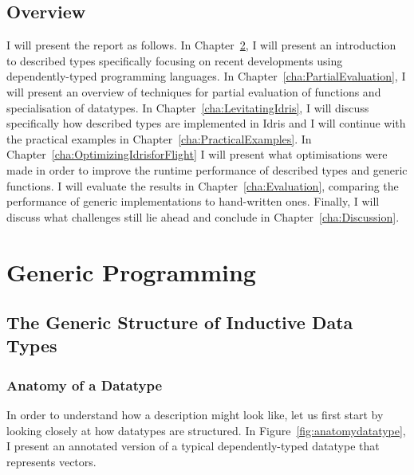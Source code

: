 \documentclass{ituthesis}
\begin{document}
\section{Overview}
\label{sec:Overview}
I will present the report as follows. In Chapter~\ref{cha:GenericProgramming}, I will present an introduction to described types specifically focusing on recent developments using dependently-typed programming languages.
In Chapter~\ref{cha:PartialEvaluation}, I will present an overview of techniques for partial evaluation of functions and specialisation of datatypes. In Chapter~\ref{cha:LevitatingIdris}, I will discuss specifically how described types are implemented in Idris and I will continue with the practical examples in Chapter~\ref{cha:PracticalExamples}.
In Chapter~\ref{cha:OptimizingIdrisforFlight} I will present what optimisations were made in order to improve the runtime performance of described types and generic functions. I will evaluate the results in Chapter~\ref{cha:Evaluation}, comparing the performance of generic implementations to hand-written ones.
Finally, I will discuss what challenges still lie ahead and conclude in Chapter~\ref{cha:Discussion}.
\chapter{Generic Programming}
\label{cha:GenericProgramming}
\section{The Generic Structure of Inductive Data Types}
\label{sec:TheGenericStructureofInductiveDataTypes}
\subsection{Anatomy of a Datatype}
\label{sub:AnatomyofaDatatype}
In order to understand how a description might look like, let us first start by looking closely at how datatypes are structured. In Figure~\ref{fig:anatomydatatype}, I present an annotated version of a typical dependently-typed datatype that represents vectors.
\end{document}
